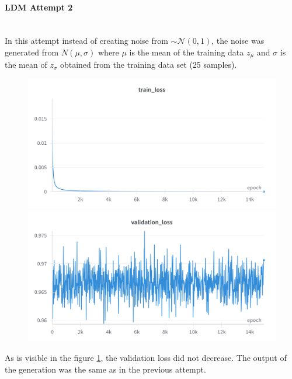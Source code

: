 
\paragraph{LDM Attempt 2}\mbox{}\\

\indent In this attempt instead of creating noise from $\sim\mathcal{N}(0,1)$, the noise was generated from $N(\mu, \sigma)$ where $\mu$ is the mean of the training data $z_{\mu}$ and $\sigma$ is the mean of $z_{\sigma}$ obtained from the training data set (25 samples).

\begin{figure}[H]
\includegraphics[width=\linewidth]{detailed_engineering/Monai Diffusion - Attempt 2/charts/train_loss.png}
\caption{}
\endminipage\hfill
{}
\includegraphics[width=\linewidth]{detailed_engineering/Monai Diffusion - Attempt 2/charts/validation_loss.png}
\caption{}
\label{fig:ldm_a2_val_loss}
\endminipage
\end{figure}

As is visible in the figure \ref{fig:ldm_a2_val_loss}, the validation loss did not decrease. The output of the generation was the same as in the previous attempt.


